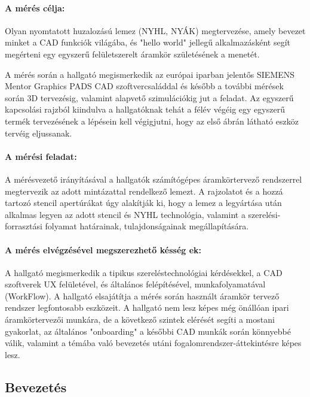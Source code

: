 \documentclass[../labor.tex]{subfiles}
\begin{document}
        \setcounter{secnumdepth}{4}

        \paragraph{A mérés célja:}

            Olyan nyomtatott huzalozású lemez (NYHL, NYÁK) megtervezése, amely bevezet minket a CAD funkciók világába, és "hello world" jellegű alkalmazásként segít megérteni egy egyszerű felületszerelt áramkör születésének a menetét.

            A mérés során a hallgató megismerkedik az európai iparban jelentős SIEMENS Mentor Graphics PADS CAD szoftvercsaláddal és később a további mérések során 3D tervezésig, valamint alapvető szimulációkig jut a feladat. Az egyszerű kapcsolási rajzból kiindulva a hallgatóknak tehát a félév végéig egy egyszerű termék tervezésének a lépésein kell végigjutni, hogy az első ábrán látható eszköz tervéig eljussanak.

        \paragraph{A mérési feladat:}

            \sloppy A mérésvezető irányításával a hallgatók számítógépes áramkörtervező rendszerrel megtervezik az adott mintázattal rendelkező lemezt. A rajzolatot és a hozzá tartozó stencil apertúrákat úgy alakítják ki, hogy a lemez a legyártása után alkalmas legyen az adott stencil és NYHL technológia, valamint a szerelési-forrasztási folyamat határainak, tulajdonságainak megállapítására.

        \paragraph{A mérés elvégzésével megszerezhető késség    ek:}

            A hallgató megismerkedik a tipikus szereléstechnológiai kérdésekkel, a CAD szoftverek UX felületével, és általános felépítésével, munkafolyamatával (WorkFlow). A hallgató elsajátítja a mérés során használt áramkör tervező rendszer legfontosabb eszközeit. A hallgató nem lesz képes még önállóan ipari áramkörtervezői munkára, de a következő szintek elérését segíti a mostani gyakorlat, az általános "onboarding" a későbbi CAD munkák során könnyebbé válik, valamint a témába való bevezetés utáni fogalomrendszer-áttekintésre képes lesz.

    \subsection{Bevezetés}
\end{document}
